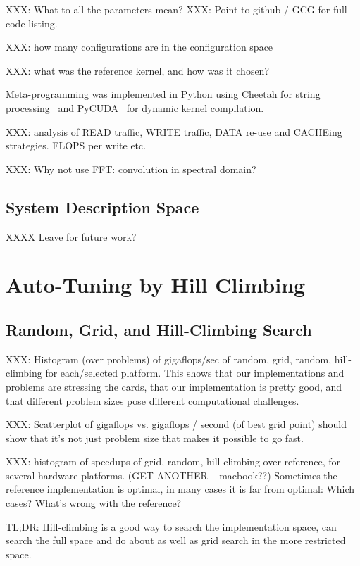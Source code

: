 \documentclass{sig-alternate}
\begin{document}
XXX: What to all the parameters mean?
XXX: Point to github / GCG for full code listing.

XXX: how many configurations are in the configuration space

XXX: what was the reference kernel, and how was it chosen?

Meta-programming was implemented in Python using
Cheetah for string processing~\citep{cheetah}
and PyCUDA~\citep{klochner+etal:2009} for dynamic kernel compilation.

XXX: analysis of READ traffic, WRITE traffic, DATA re-use and CACHEing
strategies. FLOPS per write etc.

XXX: Why not use FFT: convolution in spectral domain?

\subsection{System Description Space}

 XXXX Leave for future work?


\section{Auto-Tuning by Hill Climbing}

\subsection{Random, Grid, and Hill-Climbing Search}

XXX: Histogram (over problems) of gigaflops/sec of random, grid, random,
hill-climbing for each/selected platform.
This shows that our implementations and problems are stressing the cards,
that our implementation is pretty good, and that different problem sizes pose
different computational challenges.

XXX: Scatterplot of gigaflops vs. gigaflops / second (of best grid point)
should show that it's not just problem size that makes it possible to go fast.


XXX: histogram of speedups of grid, random, hill-climbing over reference, for
several hardware platforms. (GET ANOTHER -- macbook??)
Sometimes the reference implementation is optimal, in many cases it is far
from optimal: Which cases? What's wrong with the reference?

TL;DR: Hill-climbing is a good way to search the implementation space, can
search the full space and do about as well as grid search in the more
restricted space.
\end{document}
